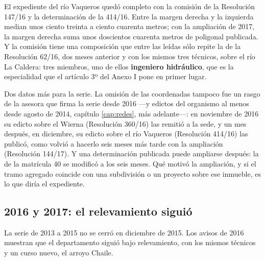 El expediente del río Vaqueros quedó completo con la comisión de la Resolución 147/16 y la determinación de la 414/16. Entre la margen derecha y la izquierda median unos ciento treinta a ciento cuarenta metros; con la ampliación de 2017, la margen derecha suma unos doscientos cuarenta metros de poligonal publicada. Y la comisión tiene una composición que entre las leídas sólo repite la de la Resolución 62/16, dos meses anterior y con los mismos tres técnicos, sobre el río La Caldera: tres miembros, uno de ellos \textbf{ingeniero hidráulico}, que es la especialidad que el artículo 3º del Anexo I pone en primer lugar.

Dos datos más para la serie. La omisión de las coordenadas tampoco fue un rasgo de la asesora que firma la serie desde 2016 ---y edictos del organismo al menos desde agosto de 2014, capítulo \ref{cap:redes}, más adelante---: en noviembre de 2016 su edicto sobre el Wierna (Resolución 360/16) las remitió a la sede, y un mes después, en diciembre, su edicto sobre el río Vaqueros (Resolución 414/16) las publicó, como volvió a hacerlo seis meses más tarde con la ampliación (Resolución 144/17). Y una determinación publicada puede ampliarse después: la de la matrícula 40 se modificó a los seis meses. Qué motivó la ampliación, y si el tramo agregado coincide con una subdivisión o un proyecto sobre ese inmueble, es lo que diría el expediente. 

\subsection*{2016 y 2017: el relevamiento siguió}

La serie de 2013 a 2015 no se cerró en diciembre de 2015. Los avisos de 2016 muestran que el departamento siguió bajo relevamiento, con los mismos técnicos y un curso nuevo, el arroyo Chaile.

